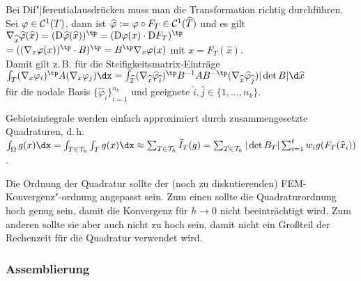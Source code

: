 \begin{Bem}
    Bei Dif"|ferentialausdrücken muss man die Transformation richtig durchführen.
    Sei $\varphi \in \mathcal{C}^1(T)$, dann ist
    $\widehat{\varphi} := \varphi \circ F_T \in \mathcal{C}^1(\widehat{T})$ und es gilt
    $\nabla_{\widehat{x}} \widehat{\varphi}(\widehat{x})
    = (\D\widehat{\varphi}(\widehat{x}))^\tp
    = (\D\varphi(x) \cdot \D F_T)^\tp$\\
    $= ((\nabla_x \varphi(x))^\tp \cdot B)^\tp
    = B^\tp \nabla_x \varphi(x)$ mit $x = F_T(\widehat{x})$.\\
    Damit gilt z.\,B. für die Steifigkeitsmatrix-Einträge\\
    $\int_T (\nabla_x \varphi_i)^\tp A (\nabla_x \varphi_j) \dx
    = \int_{\widehat{T}} (\nabla_{\widehat{x}} \widehat{\varphi}_{\widehat{i}})^\tp
    B^{-1} A B^{-\tp} (\nabla_{\widehat{x}} \widehat{\varphi}_{\widehat{j}})
    |\det B| \d\widehat{x}$\\
    für die nodale Basis $\{\widehat{\varphi}_{\widehat{i}}\}_{\widehat{i}=1}^{n_k}$ und
    geeignete $\widehat{i}, \widehat{j} \in \{1, \dotsc, n_k\}$.
\end{Bem}

\begin{Bem}
    Gebietsintegrale werden einfach approximiert durch zusammengesetzte Quadraturen, d.\,h.
    $\int_\Omega g(x)\dx
    = \int_{T \in \T_h} \int_T g(x)\dx
    \approx \sum_{T \in \T_h} \widetilde{I}_T(g)
    = \sum_{T \in \T_h} |\det B_T| \sum_{i=1}^\ell w_i g(F_T(\widehat{x}_i))$.
\end{Bem}

\begin{Bem}
    Die Ordnung der Quadratur sollte der (noch zu diskutierenden) FEM-Konvergenz"-ordnung
    angepasst sein.
    Zum einen sollte die Quadraturordnung hoch genug sein, damit die Konvergenz für $h \to 0$
    nicht beeinträchtigt wird.
    Zum anderen sollte sie aber auch nicht zu hoch sein, damit nicht ein Großteil der Rechenzeit
    für die Quadratur verwendet wird.
\end{Bem}

\pagebreak

\subsubsection{%
    Assemblierung%
}

